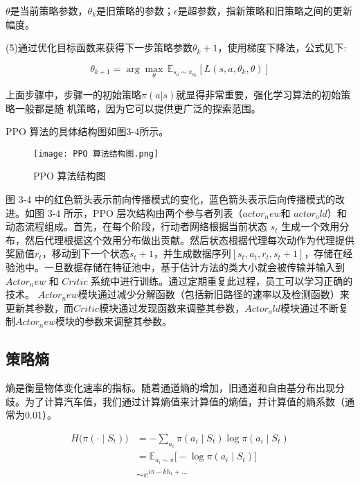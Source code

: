 \(𝜃\)是当前策略参数，\(𝜃_𝑘\)是旧策略的参数；\(𝜖\)是超参数，指新策略和旧策略之间的更新幅度。

(5)通过优化目标函数来获得下一步策略参数\(𝜃_𝑘+1\)，使用梯度下降法，公式见下:

\begin{equation}
	\theta_{k+1} = \arg\max_{\theta} \, \mathbb{E}_{s_a \sim \pi_{\theta_k}} \left[ L(s, a, \theta_k, \theta) \right]
\end{equation}

上面步骤中，步骤一的初始策略\(𝜋(𝑎|𝑠)\)就显得非常重要，强化学习算法的初始策略一般都是随
机策略，因为它可以提供更广泛的探索范围。

PPO 算法的具体结构图\cite{YYKX202405015}如图3-4所示。

\begin{figure}[hbt]
	\centering
	\texttt{[image: PPO 算法结构图.png]}
	\caption{PPO 算法结构图}
	\label{f.example}
\end{figure}

图 3-4 中的红色箭头表示前向传播模式的变化，蓝色箭头表示后向传播模式的改进。如图 3-4 所示，PPO 层次结构由两个参与者列表（\(actor_new\)和 \(actor_old）\)和动态流程组成。首先，在每个阶段，行动者网络根据当前状态 \(s_t\) 生成一个效用分布，然后代理根据这个效用分布做出贡献。然后状态根据代理每次动作为代理提供奖励值\(r_t\)，移动到下一个状态\(s_t+1\)，并生成数据序列\([s_t,a_t,r_t,s_t+1]\)，存储在经验池中。一旦数据存储在特征池中，基于估计方法的类大小就会被传输并输入到 \(Actor_new\) 和 \(Critic\) 系统中进行训练。通过定期重复此过程，员工可以学习正确的技术。 \(Actor_new\)模块通过减少分解函数（包括新旧路径的速率以及检测函数）来更新其参数，而\(Critic\)模块通过发现函数来调整其参数，\(Actor_old\)模块通过不断复制\(Actor_new\)模块的参数来调整其参数。

\subsection{策略熵}

熵是衡量物体变化速率的指标。随着通道熵的增加，旧通道和自由基分布出现分歧。为了计算汽车值，我们通过计算熵值\cite{tucker2018mirage}来计算值的熵值，并计算值的熵系数（通常为0.01）。

\begin{align}
	H\big(\pi(\cdot \mid S_t)\big) &= -\sum_{a_i} \pi(a_i \mid S_t) \log \pi(a_i \mid S_t) \\
	&= \mathbb{E}_{a_i \sim \pi} \Big[ -\log \pi(a_i \mid S_t) \Big] \\
	&\sim e^{i\pi - k h_1 + \dots}
\end{align}

